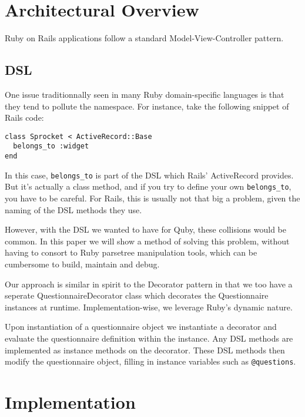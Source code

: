 \documentclass[10pt,fleqn,a4paper]{article}
\begin{document}
\begin{twocolumn}
\section{Architectural Overview}

Ruby on Rails applications follow a standard Model-View-Controller pattern.

\subsection{DSL}

One issue traditionnally seen in many Ruby domain-specific languages is that they tend to pollute the namespace. For instance, take the following snippet of Rails code:

\begin{lstlisting}
class Sprocket < ActiveRecord::Base
  belongs_to :widget
end
\end{lstlisting}

In this case, \lstinline{belongs_to} is part of the DSL which Rails' ActiveRecord provides. But it's actually a class method, and if you try to define your own \lstinline{belongs_to}, you have to be careful. For Rails, this is usually not that big a problem, given the naming of the DSL methods they use.

However, with the DSL we wanted to have for Quby, these collisions would be common. In this paper we will show a method of solving this problem, without having to consort to Ruby parsetree manipulation tools, which can be cumbersome to build, maintain and debug.

Our approach is similar in spirit to the Decorator pattern\cite{Erich:1995design} in that we too have a seperate Questionnaire\-Decorator class which decorates the Questionnaire instances at runtime. Implementation-wise, we leverage Ruby's dynamic nature.

Upon instantiation of a questionnaire object we instantiate a decorator and evaluate the questionnaire definition within the instance. Any DSL methods are implemented as instance methods on the decorator. These DSL methods then modify the questionnaire object, filling in instance variables such as \lstinline{@questions}.

\section{Implementation}




\end{twocolumn}
\end{document}
